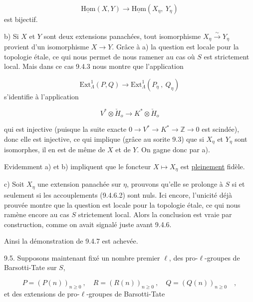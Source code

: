 \begin{equation*}
\underline{\mathrm{Hom}}(X,Y) \longrightarrow \underline{\mathrm{Hom}}(X_\eta,\ Y_\eta)
\end{equation*}
est bijectif.

b)  Si $X$ et $Y$ sont deux extensions panachées, tout isomorphisme $X_\eta \xrightarrow{\sim} Y_\eta$ provient d'un isomorphisme $X \longrightarrow Y$. Grâce à a) la question est locale pour la topologie étale, ce qui nous permet de nous ramener au cas où $S$ est strictement local. Mais dans ce cas 9.4.3 nous montre que l'application

\begin{equation*}
\mathrm{Ext}^1_\Lambda(P,Q) \longrightarrow \mathrm{Ext}^1_\Lambda(P_\eta\ ,\ Q_\eta)
\end{equation*}
s'identifie à l'application

\begin{equation*}
V^* \otimes \check{H}_o \longrightarrow K^* \otimes \check{H}_o
\end{equation*}



qui est injective (puisque la suite exacte $0 \longrightarrow V^* \longrightarrow K^* \longrightarrow \mathbb{Z} \longrightarrow 0$ est scindée), donc elle est injective, ce qui implique (grâce au sorite 9.3) que si $X_\eta$ et $Y_\eta$ sont isomorphes, il en est de même de $X$ et de $Y$. On gagne donc par a).

Evidemment a) et b) impliquent que le foncteur $X \longmapsto X_\eta$ est \underline{pleinement} fidèle.

c)  Soit $X_\eta$ une extension panachée sur $\eta$, prouvons qu'elle se prolonge à $S$ si et seulement si les accouplements (9.4.6.2) sont nuls. Ici encore, l'unicité déjà prouvée montre que la question est locale pour la topologie étale, ce qui nous ramène encore au cas $S$ strictement local. Alors la conclusion est vraie par construction, comme on avait signalé juste avant 9.4.6.

Ainsi la démonstration de 9.4.7 est achevée.

9.5.  Supposons maintenant fixé un nombre premier $\ell$, des pro-$\ell$-groupes de Barsotti-Tate sur $S$,

\begin{equation}\tag{9.5.1}
P = (P(n))_{n \geq 0} \ , \quad R = (R(n))_{n \geq 0} \ , \quad Q = (Q(n))_{n \geq 0} \quad ,
\end{equation}
et des extensions de pro-$\ell$-groupes de Barsotti-Tate


